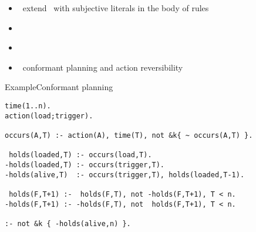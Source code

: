 \begin{frame}{\eclingo}
  \begin{itemize}
  \item {} \ extend \clingo\ with subjective literals in the body of rules
  \item {} \
  \item {} \ \cite{cafagarosc20a}
  \item {} \ conformant planning \cite{cafafa21a} and action reversibility \cite{famoch21a}
  \end{itemize}
\end{frame}
\begin{frame}[fragile]{Example}{Conformant planning}
\begin{lstlisting}[language=clingo,basicstyle=\scriptsize\ttfamily]%,literate={~}{{$\sim$}}1]
time(1..n).
action(load;trigger).

occurs(A,T) :- action(A), time(T), not &k{ ~ occurs(A,T) }.

 holds(loaded,T) :- occurs(load,T).
-holds(loaded,T) :- occurs(trigger,T).
-holds(alive,T)  :- occurs(trigger,T), holds(loaded,T-1).

 holds(F,T+1) :-  holds(F,T), not -holds(F,T+1), T < n.
-holds(F,T+1) :- -holds(F,T), not  holds(F,T+1), T < n.

:- not &k { -holds(alive,n) }.
\end{lstlisting}
\end{frame}
%
